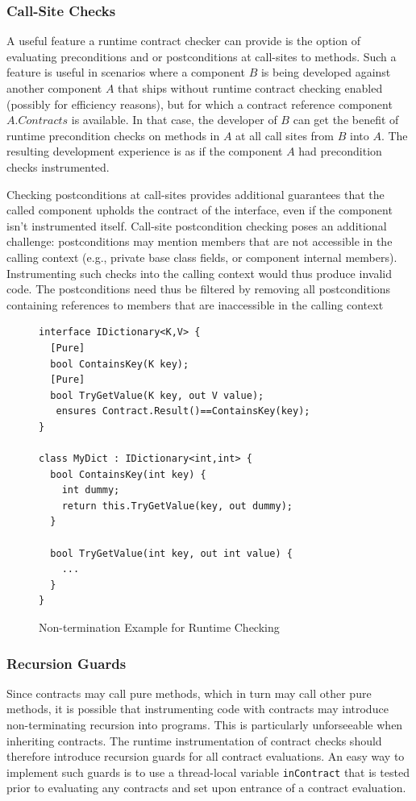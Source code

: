 \documentclass{sig-alternate}
\newcommand{\code}[1]{\lstinline{#1}}
\begin{document}
\subsubsection{Call-Site Checks}
\noindent
A useful feature a runtime contract checker can provide is the option
of evaluating preconditions and or postconditions at call-sites to
methods. Such a feature is useful in scenarios where a component $B$
is being developed against another component $A$ that ships without
runtime contract checking enabled (possibly for efficiency reasons),
but for which a contract reference component $A.Contracts$ is available. In that case, the
developer of $B$ can get the benefit of runtime precondition checks on
methods in $A$ at all call sites from $B$ into $A$. The resulting
development experience is as if the component $A$ had precondition
checks instrumented.

Checking postconditions at call-sites provides additional guarantees
that the called component upholds the contract of the interface, even
if the component isn't instrumented itself. Call-site postcondition
checking poses an additional challenge: postconditions may
mention members that are not accessible in the calling context (e.g.,
private base class fields, or component internal
members). Instrumenting such checks into the calling context would
thus produce invalid code. The postconditions need thus be
filtered by removing all postconditions containing references to
members that are inaccessible in the calling context

\begin{figure}[tb!]
\begin{lstlisting}
interface IDictionary<K,V> {
  [Pure]
  bool ContainsKey(K key);
  [Pure]
  bool TryGetValue(K key, out V value);
   ensures Contract.Result()==ContainsKey(key);
}

class MyDict : IDictionary<int,int> {
  bool ContainsKey(int key) {
    int dummy;
    return this.TryGetValue(key, out dummy);
  }

  bool TryGetValue(int key, out int value) {
    ...
  }
}
\end{lstlisting}
\caption{Non-termination Example for Runtime Checking}
\label{fig:non-termination}
\end{figure}


\subsubsection{Recursion Guards}
\noindent
Since contracts may call pure methods, which in turn may call other
pure methods, it is possible that instrumenting code with contracts
may introduce non-terminating recursion into programs. This is
particularly unforseeable when inheriting contracts. The runtime
instrumentation of contract checks should therefore introduce
recursion guards for all contract evaluations. An easy way to
implement such guards is to use a thread-local variable
\code{inContract} that is tested prior to evaluating any contracts and
set upon entrance of a contract evaluation.
\end{document}
